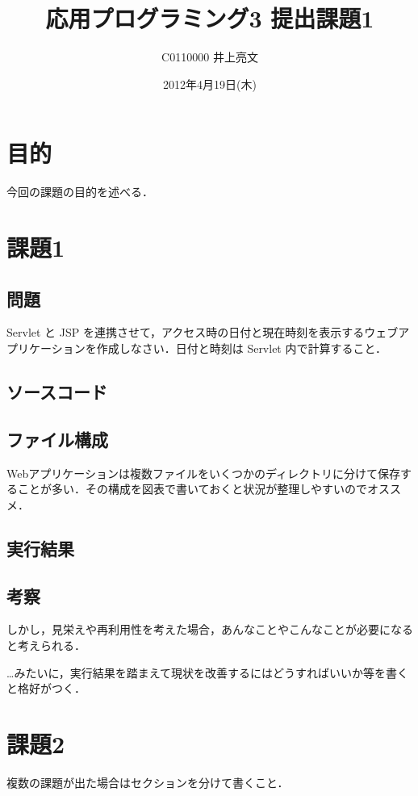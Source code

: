 \documentclass[a4j,10pt]{jsarticle}
\title{応用プログラミング3 提出課題1}
\author{C0110000 井上亮文}
\date{2012年4月19日(木)}
\begin{document}
\maketitle


\section{目的}

今回の課題の目的を述べる．


\section{課題1}

\subsection{問題}

Servlet と JSP を連携させて，アクセス時の日付と現在時刻を表示するウェブア
プリケーションを作成しなさい．日付と時刻は Servlet 内で計算すること．


\subsection{ソースコード}

% 


\subsection{ファイル構成}

Webアプリケーションは複数ファイルをいくつかのディレクトリに分けて保存す
ることが多い．その構成を図表で書いておくと状況が整理しやすいのでオススメ．


\subsection{実行結果}

% 


\subsection{考察}

しかし，見栄えや再利用性を考えた場合，あんなことやこんなことが必要になる
と考えられる．

…みたいに，実行結果を踏まえて現状を改善するにはどうすればいいか等を書く
と格好がつく．

\section{課題2}

複数の課題が出た場合はセクションを分けて書くこと．
\end{document}
